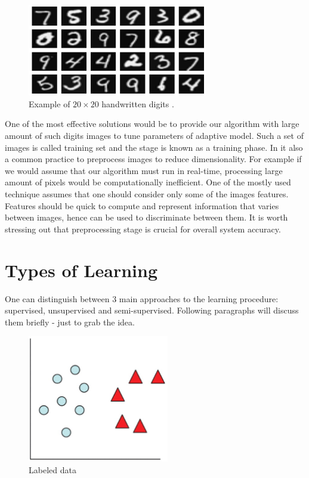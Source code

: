 \documentclass{mini}
\begin{document}
\begin{figure}
  \begin{center}
    \includegraphics[width=0.7\textwidth]{images/handwritten_digits_example.png}
  \end{center}
  \caption{Example of $20 \times 20$ handwritten digits \cite{handwritten_digits_intro}.}
  \label{fig:handwritten_ex}
\end{figure}

One of the most effective solutions would be to provide our algorithm with large amount of such digits images to tune parameters of adaptive model. Such a set of images is called training set and the stage is known as a training phase. In it also a common practice to preprocess images to reduce dimensionality. For example if we would assume that our algorithm must run in real-time, processing large amount of pixels would be computationally inefficient. One of the mostly used technique assumes that one should consider only some of the images features. Features should be quick to compute and represent information that varies between images, hence can be used to discriminate between them. It is worth stressing out that preprocessing stage is crucial for overall system accuracy.


\section{Types of Learning}
One can distinguish between 3 main approaches to the learning procedure: supervised, unsupervised and semi-supervised. Following paragraphs will discuss them briefly - just to grab the idea.

\begin{figure}
  \begin{center}
    \includegraphics[width=0.55\textwidth]{images/supervised_graph.png}
  \end{center}
  \caption{Labeled data}
  \label{fig:handwritten_ex}
\end{figure}
\end{document}
